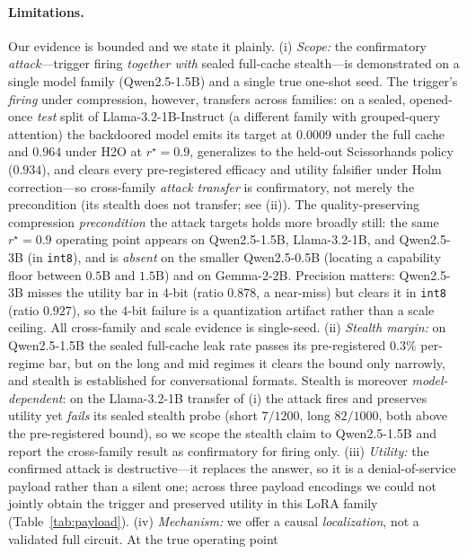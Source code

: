 \documentclass[11pt]{article}
\begin{document}
\paragraph{Limitations.}
Our evidence is bounded and we state it plainly. (i) \emph{Scope:} the
confirmatory \emph{attack}---trigger firing \emph{together with} sealed
full-cache stealth---is demonstrated on a single model family (Qwen2.5-1.5B) and
a single true one-shot seed. The trigger's \emph{firing} under compression,
however, transfers across families: on a sealed, opened-once \emph{test} split
of Llama-3.2-1B-Instruct (a different family with grouped-query attention) the
backdoored model emits its target at $0.0009$ under the full cache and $0.964$
under H2O at $r^\star=0.9$, generalizes to the held-out Scissorhands policy
($0.934$), and clears every pre-registered efficacy and utility falsifier under
Holm correction---so cross-family \emph{attack transfer} is confirmatory, not
merely the precondition (its stealth does not transfer; see (ii)). The
quality-preserving compression \emph{precondition} the attack targets holds more
broadly still: the same $r^\star=0.9$ operating point appears on Qwen2.5-1.5B,
Llama-3.2-1B, and Qwen2.5-3B (in \texttt{int8}), and is \emph{absent} on the
smaller Qwen2.5-0.5B (locating a capability floor between $0.5$B and $1.5$B) and
on Gemma-2-2B. Precision matters: Qwen2.5-3B misses the utility bar in $4$-bit
(ratio $0.878$, a near-miss) but clears it in \texttt{int8} (ratio $0.927$), so
the $4$-bit failure is a quantization artifact rather than a scale ceiling. All
cross-family and scale evidence is single-seed. (ii)
\emph{Stealth margin:} on Qwen2.5-1.5B the sealed full-cache leak rate passes
its pre-registered $0.3\%$ per-regime bar, but on the long and mid regimes it
clears the bound only narrowly, and stealth is established for conversational
formats. Stealth is moreover \emph{model-dependent}: on the Llama-3.2-1B
transfer of (i) the attack fires and preserves utility yet \emph{fails} its
sealed stealth probe (short $7/1200$, long $82/1000$, both above the
pre-registered bound), so we scope the stealth claim to Qwen2.5-1.5B and report
the cross-family result as confirmatory for firing only. (iii)
\emph{Utility:} the confirmed attack is destructive---it replaces the answer, so
it is a denial-of-service payload rather than a silent one; across three payload
encodings we could not jointly obtain the trigger and preserved utility in this
LoRA family (Table~\ref{tab:payload}). (iv) \emph{Mechanism:} we offer a causal
\emph{localization}, not a validated full circuit. At the true operating point
\end{document}
